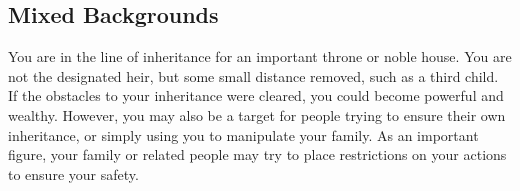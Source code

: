   \subsection{Mixed Backgrounds}
     You are in the line of inheritance for an important throne or noble house.
    You are not the designated heir, but some small distance removed, such as a third child.
    If the obstacles to your inheritance were cleared, you could become powerful and wealthy.
    However, you may also be a target for people trying to ensure their own inheritance, or simply using you to manipulate your family.
    As an important figure, your family or related people may try to place restrictions on your actions to ensure your safety.





